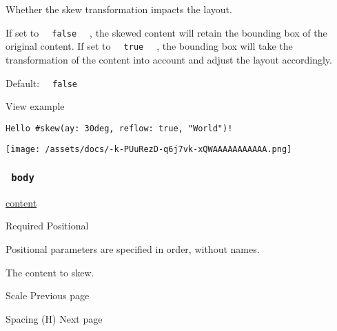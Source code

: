 Whether the skew transformation impacts the layout.

If set to \texttt{\ }{\texttt{\ false\ }}\texttt{\ } , the skewed
content will retain the bounding box of the original content. If set to
\texttt{\ }{\texttt{\ true\ }}\texttt{\ } , the bounding box will take
the transformation of the content into account and adjust the layout
accordingly.

Default: \texttt{\ }{\texttt{\ false\ }}\texttt{\ }


View example

\begin{verbatim}
Hello #skew(ay: 30deg, reflow: true, "World")!
\end{verbatim}

\texttt{[image: /assets/docs/-k-PUuRezD-q6j7vk-xQWAAAAAAAAAAA.png]}

\subsubsection{\texorpdfstring{\texttt{\ body\ }}{ body }}\label{parameters-body}

\href{/docs/reference/foundations/content/}{content}

{Required} {{ Positional }}

\label{parameters-body-positional-tooltip}
Positional parameters are specified in order, without names.

The content to skew.

\href{/docs/reference/layout/scale/}{\pandocbounded{}}

{ Scale } { Previous page }

\href{/docs/reference/layout/h/}{\pandocbounded{}}

{ Spacing (H) } { Next page }
